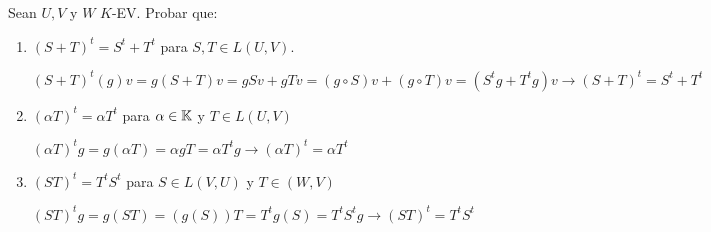 \item Sean $U,V$ y $W$ $K$-EV. Probar que:
    \begin{enumerate}
        \item $(S+T)^t=S^t+T^t$ para $S,T\in L(U,V).$
            \begin{mdframed}[style=s]
                $(S+T)^t(g)v=g(S+T)v=gSv+gTv=(g\circ S)v+(g\circ T)v=(S^tg+T^tg)v\to (S+T)^t=S^t+T^t$
            \end{mdframed}
        \item $(\alpha T)^t=\alpha T^t$ para $\alpha\in\mathbb{K}$ y $T\in L(U,V)$
            \begin{mdframed}[style=s]
                $(\alpha T)^tg=g(\alpha T)=\alpha gT=\alpha T^tg\to (\alpha T)^t=\alpha T^t$
            \end{mdframed}
        \item $(ST)^t=T^tS^t$ para $S\in L(V,U)$ y $T\in (W,V)$
            \begin{mdframed}[style=s]
                $(ST)^tg=g(ST)=(g(S))T=T^tg(S)=T^tS^tg\to (ST)^t=T^tS^t$
            \end{mdframed}
    \end{enumerate}
    